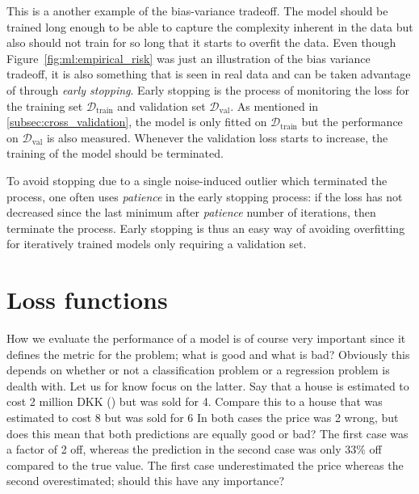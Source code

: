 This is a another example of the bias-variance tradeoff. The model should be trained long enough to be able to capture the complexity inherent in the data but also should not train for so long that it starts to overfit the data. Even though Figure~\ref{fig:ml:empirical_risk} was just an illustration of the bias variance tradeoff, it is also something that is seen in real data and can be taken advantage of through \emph{early stopping}. Early stopping is the process of monitoring the loss for the training set $\mathcal{D}_\mathrm{train}$ and validation set $\mathcal{D}_\mathrm{val}$. As mentioned in \autoref{subsec:cross_validation}, the model is only fitted on $\mathcal{D}_\mathrm{train}$ but the performance on $\mathcal{D}_\mathrm{val}$ is also measured. Whenever the validation loss starts to increase, the training of the model should be terminated. 

To avoid stopping due to a single noise-induced outlier which terminated the process, one often uses \emph{patience} in the early stopping process: if the loss has not decreased since the last minimum after \emph{patience} number of iterations, then terminate the process. Early stopping is thus an easy way of avoiding overfitting for iteratively trained models only requiring a validation set.  

\section{Loss functions}
\label{sec:ml:loss_function}
How we evaluate the performance of a model is of course very important since it defines the metric for the problem; what is good and what is bad? Obviously this depends on whether or not a classification problem or a regression problem is dealth with. Let us for know focus on the latter. Say that a house is estimated to cost \num{2} million DKK (\si{\Mkr}) but was sold for \SI{4}{\Mkr}. Compare this to a house that was estimated to cost \SI{8}{\Mkr} but was sold for \SI{6}{\Mkr} In both cases the price was \SI{2}{\Mkr} wrong, but does this mean that both predictions are equally good or bad? The first case was a factor of 2 off, whereas the prediction in the second case was only $33\%$ off compared to the true value. The first case underestimated the price whereas the second overestimated; should this have any importance?


